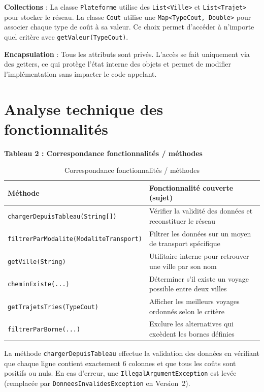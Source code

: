 \documentclass[fontsize=10pt,oneside,parskip=half]{scrreprt}
\newcommand{\ic}[1]{{\setlength{\fboxsep}{2pt}\colorbox{BeigeSerein}{\texttt{#1}}}}
\begin{document}
\noindent\textbf{Collections} : La classe \ic{Plateforme} utilise des
\ic{List<Ville>} et \ic{List<Trajet>} pour stocker le réseau. La classe \ic{Cout}
utilise une \ic{Map<TypeCout, Double>} pour associer chaque type de coût à sa valeur.
Ce choix permet d'accéder à n'importe quel critère avec \ic{getValeur(TypeCout)}.

\noindent\textbf{Encapsulation} : Tous les attributs sont privés. L'accès se fait
uniquement via des getters, ce qui protège l'état interne des objets et permet de
modifier l'implémentation sans impacter le code appelant.

\section{Analyse technique des fonctionnalités}

\noindent\textbf{Tableau 2 : Correspondance fonctionnalités / méthodes}

\begin{table}[H]
  \centering
  \begin{tabularx}{\textwidth}{lX}
    \toprule
    \textbf{Méthode} & \textbf{Fonctionnalité couverte (sujet)} \\
    \midrule
    \ic{chargerDepuisTableau(String[])} & Vérifier la validité des données et reconstituer le réseau \\
    \ic{filtrerParModalite(ModaliteTransport)} & Filtrer les données sur un moyen de transport spécifique \\
    \ic{getVille(String)} & Utilitaire interne pour retrouver une ville par son nom \\
    \ic{cheminExiste(...)} & Déterminer s'il existe un voyage possible entre deux villes \\
    \ic{getTrajetsTries(TypeCout)} & Afficher les meilleurs voyages ordonnés selon le critère \\
    \ic{filtrerParBorne(...)} & Exclure les alternatives qui excèdent les bornes définies \\
    \bottomrule
  \end{tabularx}
  \caption{Correspondance fonctionnalités / méthodes}
\end{table}

La méthode \ic{chargerDepuisTableau} effectue la validation des données en
vérifiant que chaque ligne contient exactement 6 colonnes et que tous les coûts
sont positifs ou nuls. En cas d'erreur, une \ic{IllegalArgumentException} est
levée (remplacée par \ic{DonneesInvalidesException} en Version~2).
\end{document}
